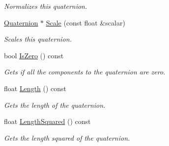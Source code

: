 \begin{DoxyCompactItemize}
\begin{DoxyCompactList}\small\item\em Normalizes this quaternion. \end{DoxyCompactList}\item 
\hyperlink{class_flounder_1_1_quaternion}{Quaternion} $\ast$ \hyperlink{class_flounder_1_1_quaternion_a75f0b2799fb2eb02265d7e41c93cb25b}{Scale} (const float \&scalar)
\begin{DoxyCompactList}\small\item\em Scales this quaternion. \end{DoxyCompactList}\item 
bool \hyperlink{class_flounder_1_1_quaternion_a73eb421d4ea51cc5aff973ebe19ad880}{Is\+Zero} () const
\begin{DoxyCompactList}\small\item\em Gets if all the components to the quaternion are zero. \end{DoxyCompactList}\item 
float \hyperlink{class_flounder_1_1_quaternion_ac35d4bb1fedfd7096f766c8dfa6bf646}{Length} () const
\begin{DoxyCompactList}\small\item\em Gets the length of the quaternion. \end{DoxyCompactList}\item 
float \hyperlink{class_flounder_1_1_quaternion_ae665911fb0dcf31a75c462c7ea80ae58}{Length\+Squared} () const
\begin{DoxyCompactList}\small\item\em Gets the length squared of the quaternion. \end{DoxyCompactList}\end{DoxyCompactItemize}

